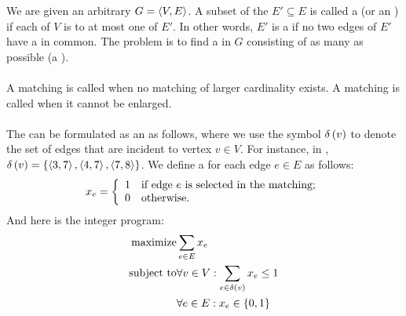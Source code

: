 \begin{definition}
We are given an arbitrary  $G=\left\langle V,E \right\rangle$. A subset of the  $E'\subseteq E$ is called a  (or an ) if each  of $V$ is  to at most one  of $E'$. In other words, $E'$ is a  if no two edges of $E'$ have a  in common. The problem is to find a  in $G$ consisting of as many  as possible (a ).
\end{definition}


\paragraph{}
A matching is called  when no matching of larger cardinality exists. A matching is called  when it cannot be enlarged.

\paragraph{}
The  can be formulated as an  as follows, where we use the symbol $\delta\left( v \right)$ to denote the set of edges that are incident to vertex $v\in V$. For instance, in , $\delta\left( v \right)=\left\{ \left\langle 3,7 \right\rangle,\left\langle 4,7 \right\rangle,\left\langle 7,8 \right\rangle \right\}$. We define a  for each edge $e\in E$ as follows:
\begin{equation}
x_e=\left\{\begin{array}{ll} 1&\mbox{if edge $e$ is selected in the matching;}\\0&\mbox{otherwise.} \end{array}\right.
\end{equation}
And here is the integer program:
\begin{eqnarray}
\mbox{maximize}&\sumdomain[e]{E}{x_e}\eqnlab{matching-m}\\
\mbox{subject to}&\forall v\in V:\sumdomain[e]{\fun{\delta}{v}}{x_e}\leq 1\eqnlab{matching-c1}\\
&\forall e\in E:x_e\in\accl{0,1}\eqnlab{matching-c2}
\end{eqnarray}

